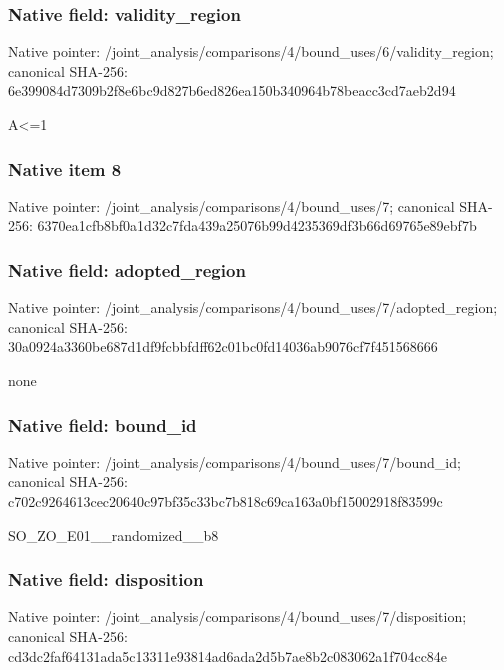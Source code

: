 \documentclass[10pt,a4paper]{article}
\begin{document}
\subsubsection{Native field: validity\_\allowbreak{}region}
Native pointer: /joint\_\allowbreak{}analysis/comparisons/4/bound\_\allowbreak{}uses/6/validity\_\allowbreak{}region; canonical SHA-256: 6e399084d7309b2f8e6bc9d827b6ed826ea150b340964b78beacc3cd7aeb2d94

\begingroup\raggedright\sloppy A<=\allowbreak{}1\par\endgroup

\subsubsection{Native item 8}
Native pointer: /joint\_\allowbreak{}analysis/comparisons/4/bound\_\allowbreak{}uses/7; canonical SHA-256: 6370ea1cfb8bf0a1d32c7fda439a25076b99d4235369df3b66d69765e89ebf7b

\subsubsection{Native field: adopted\_\allowbreak{}region}
Native pointer: /joint\_\allowbreak{}analysis/comparisons/4/bound\_\allowbreak{}uses/7/adopted\_\allowbreak{}region; canonical SHA-256: 30a0924a3360be687d1df9fcbbfdff62c01bc0fd14036ab9076cf7f451568666

\begingroup\raggedright\sloppy none\par\endgroup

\subsubsection{Native field: bound\_\allowbreak{}id}
Native pointer: /joint\_\allowbreak{}analysis/comparisons/4/bound\_\allowbreak{}uses/7/bound\_\allowbreak{}id; canonical SHA-256: c702c9264613cec20640c97bf35c33bc7b818c69ca163a0bf15002918f83599c

\begingroup\raggedright\sloppy SO\_\allowbreak{}ZO\_\allowbreak{}E01\_\allowbreak{}\_\allowbreak{}randomized\_\allowbreak{}\_\allowbreak{}b8\par\endgroup

\subsubsection{Native field: disposition}
Native pointer: /joint\_\allowbreak{}analysis/comparisons/4/bound\_\allowbreak{}uses/7/disposition; canonical SHA-256: cd3dc2faf64131ada5c13311e93814ad6ada2d5b7ae8b2c083062a1f704cc84e
\end{document}
